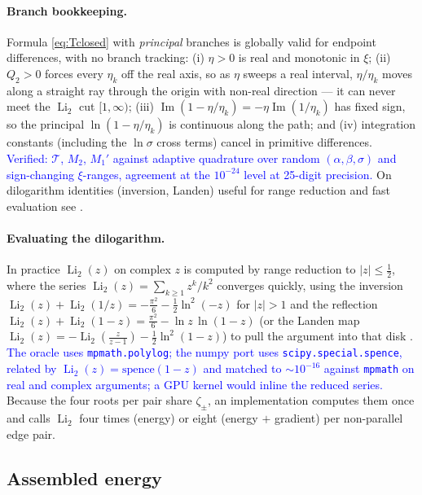 \documentclass[11pt]{article}
\newcommand{\aside}[1]{\textcolor{blue}{#1}}
\newcommand{\Li}{\operatorname{Li}_2}
\begin{document}
\paragraph{Branch bookkeeping.}
Formula \eqref{eq:Tclosed} with \emph{principal} branches is globally valid for
endpoint differences, with no branch tracking: (i) $\eta>0$ is real and monotonic in
$\xi$; (ii) $Q_2>0$ forces every $\eta_k$ off the real axis, so as $\eta$ sweeps a
real interval, $\eta/\eta_k$ moves along a straight ray through the origin with
non-real direction --- it can never meet the $\Li$ cut $[1,\infty)$; (iii)
$\operatorname{Im}(1-\eta/\eta_k)=-\eta\operatorname{Im}(1/\eta_k)$ has fixed sign,
so the principal $\ln(1-\eta/\eta_k)$ is continuous along the path; and (iv)
integration constants (including the $\ln\sigma$ cross terms) cancel in primitive
differences.  \aside{Verified: $\mathcal T$, $M_2$, $M_1'$ against adaptive
quadrature over random $(\alpha,\beta,\sigma)$ and sign-changing $\xi$-ranges,
agreement at the $10^{-24}$ level at 25-digit precision.}  On dilogarithm identities
(inversion, Landen) useful for range reduction and fast evaluation see
\cite{Lewin1981,DLMF}.

\paragraph{Evaluating the dilogarithm.}  In practice $\Li(z)$ on complex $z$ is computed
by range reduction to $|z|\le\tfrac12$, where the series $\Li(z)=\sum_{k\ge1}z^k/k^2$
converges quickly, using the inversion
$\Li(z)+\Li(1/z)=-\tfrac{\pi^2}{6}-\tfrac12\ln^2(-z)$ for $|z|>1$ and the reflection
$\Li(z)+\Li(1-z)=\tfrac{\pi^2}{6}-\ln z\,\ln(1-z)$ (or the Landen map
$\Li(z)=-\Li(\tfrac{z}{z-1})-\tfrac12\ln^2(1-z)$) to pull the argument into that disk
\cite{Lewin1981,DLMF}.  \aside{The oracle uses \texttt{mpmath.polylog}; the numpy port
uses \texttt{scipy.special.spence}, related by $\Li(z)=\mathrm{spence}(1-z)$ and matched
to $\sim10^{-16}$ against \texttt{mpmath} on real and complex arguments; a GPU kernel
would inline the reduced series.}  Because the four roots per pair share $\zeta_\pm$, an
implementation computes them once and calls $\Li$ four times (energy) or eight (energy
$+$ gradient) per non-parallel edge pair.

\subsection{Assembled energy}
\label{sec:energyassembled}
\end{document}
